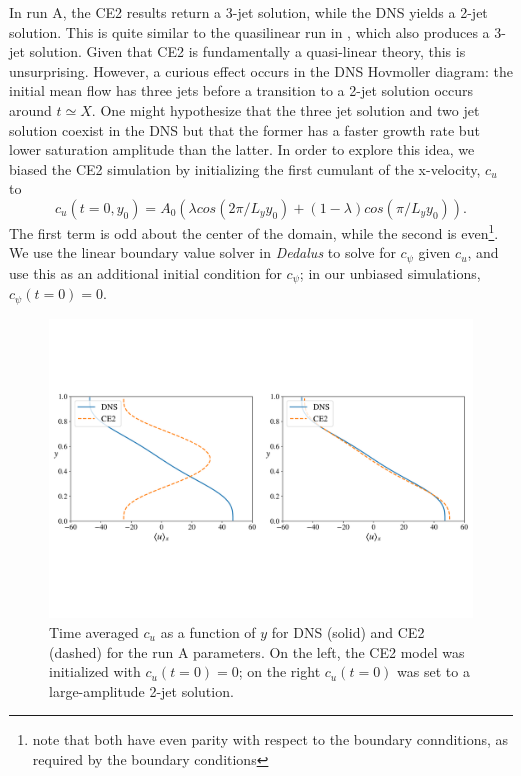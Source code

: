 \documentclass{jfm}
\newcommand{\cu}{c_u}
\begin{document}
In run A, the CE2 results return a 3-jet solution, while the DNS yields a 2-jet solution.
This is quite similar to the quasilinear run in \citet{2018RSPSA.47480422T}, which also produces a 3-jet solution.
Given that CE2 is fundamentally a quasi-linear theory, this is unsurprising.
However, a curious effect occurs in the DNS Hovmoller diagram:
the initial mean flow has three jets before a transition to a 2-jet solution occurs around $t \simeq X$.
One might hypothesize that the three jet solution and two jet solution coexist in the DNS but that the former has a faster growth rate but lower saturation amplitude than the latter.
In order to explore this idea, we biased the CE2 simulation by initializing the first cumulant of the x-velocity, $\cu$ to
\begin{equation}
  \label{eq:bias}
  \cu(t=0, y_0) = A_0 \left( \lambda cos(2\pi/L_y y_0) + (1-\lambda) cos (\pi/L_y y_0)\right).
\end{equation}
The first term is odd about the center of the domain, while the second is even\footnote{note that both have even parity with respect to the boundary connditions, as required by the boundary conditions}.
We use the linear boundary value solver in \emph{Dedalus} to solve for $c_\psi$ given $\cu$, and use this as an additional initial condition for $c_\psi$; in our unbiased simulations, $c_\psi(t=0) = 0$.
\begin{figure}
  \centering
  \includegraphics[width=\textwidth]{../../figs/umean_dns_ce2_runA_I.pdf}
  \caption{Time averaged $\cu$ as a function of $y$ for DNS (solid) and CE2 (dashed) for the run A parameters. On the left, the CE2 model was initialized with $\cu(t=0) = 0$; on the right $\cu(t=0)$ was set to a large-amplitude 2-jet solution.}
  \label{fig:cu_vs_y_runAI}
\end{figure}
\end{document}
